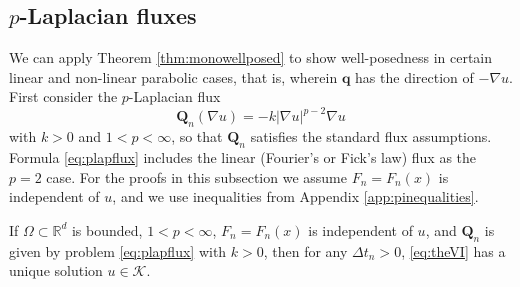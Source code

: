 \documentclass[final,onefignum]{siamart190516}
\newcommand\bq{\mathbf{q}}
\newcommand\bQ{\mathbf{Q}}
\newcommand{\grad}{\nabla}
\newcommand\RR{\mathbb{R}}
\begin{document}
\subsection{$p$-Laplacian fluxes} \label{subsec:plap}  We can apply Theorem \ref{thm:monowellposed} to show well-posedness in certain linear and non-linear parabolic cases, that is, wherein $\bq$ has the direction of $-\grad u$.  First consider the $p$-Laplacian \cite{Evans2010} flux
\begin{equation}
  \bQ_n(\grad u) = - k |\grad u|^{p-2} \grad u \label{eq:plapflux}
\end{equation}
with $k>0$ and $1<p<\infty$, so that $\bQ_n$ satisfies the standard flux assumptions.  Formula \eqref{eq:plapflux} includes the linear (Fourier's or Fick's law) flux as the $p=2$ case.  For the proofs in this subsection we assume $F_n=F_n(x)$ is independent of $u$, and we use inequalities from Appendix \ref{app:pinequalities}.

\begin{theorem}  \label{thm:plapwellposed}  If $\Omega\subset \RR^d$ is bounded, $1<p<\infty$, $F_n=F_n(x)$ is independent of $u$, and $\bQ_n$ is given by problem \eqref{eq:plapflux} with $k>0$, then for any $\Delta t_n>0$, \eqref{eq:theVI} has a unique solution $u\in\mathcal{K}$.
\end{theorem}
\end{document}

